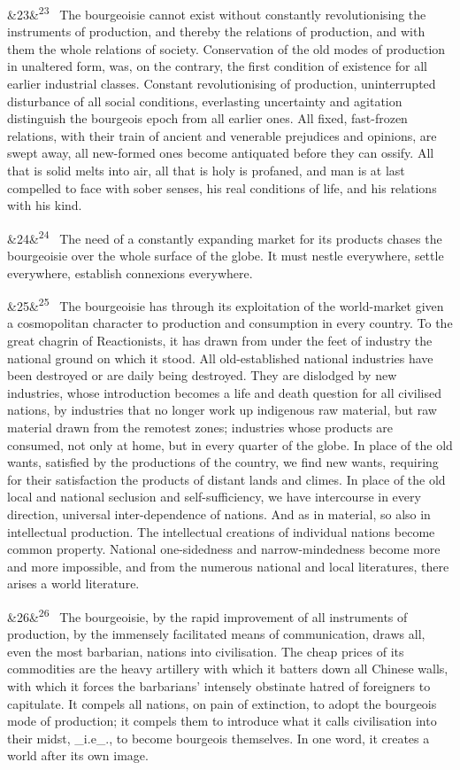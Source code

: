 \documentclass[12pt]{article}
\newcommand{\para}[1][]{\par\noindent\ifx&#1&\else\textsuperscript{\footnotesize #1}~\fi}
\begin{document}
\para[23] The bourgeoisie cannot exist without constantly revolutionising the instruments of production, and thereby the relations of production, and with them the whole relations of society. Conservation of the old modes of production in unaltered form, was, on the contrary, the first condition of existence for all earlier industrial classes. Constant revolutionising of production, uninterrupted disturbance of all social conditions, everlasting uncertainty and agitation distinguish the bourgeois epoch from all earlier ones. All fixed, fast-frozen relations, with their train of ancient and venerable prejudices and opinions, are swept away, all new-formed ones become antiquated before they can ossify. All that is solid melts into air, all that is holy is profaned, and man is at last compelled to face with sober senses, his real conditions of life, and his relations with his kind.

\para[24] The need of a constantly expanding market for its products chases the bourgeoisie over the whole surface of the globe. It must nestle everywhere, settle everywhere, establish connexions everywhere.

\para[25] The bourgeoisie has through its exploitation of the world-market given a cosmopolitan character to production and consumption in every country. To the great chagrin of Reactionists, it has drawn from under the feet of industry the national ground on which it stood. All old-established national industries have been destroyed or are daily being destroyed. They are dislodged by new industries, whose introduction becomes a life and death question for all civilised nations, by industries that no longer work up indigenous raw material, but raw material drawn from the remotest zones; industries whose products are consumed, not only at home, but in every quarter of the globe. In place of the old wants, satisfied by the productions of the country, we find new wants, requiring for their satisfaction the products of distant lands and climes. In place of the old local and national seclusion and self-sufficiency, we have intercourse in every direction, universal inter-dependence of nations. And as in material, so also in intellectual production. The intellectual creations of individual nations become common property. National one-sidedness and narrow-mindedness become more and more impossible, and from the numerous national and local literatures, there arises a world literature.

\para[26] The bourgeoisie, by the rapid improvement of all instruments of production, by the immensely facilitated means of communication, draws all, even the most barbarian, nations into civilisation. The cheap prices of its commodities are the heavy artillery with which it batters down all Chinese walls, with which it forces the barbarians' intensely obstinate hatred of foreigners to capitulate. It compels all nations, on pain of extinction, to adopt the bourgeois mode of production; it compels them to introduce what it calls civilisation into their midst, \_i.e\_., to become bourgeois themselves. In one word, it creates a world after its own image.
\end{document}
